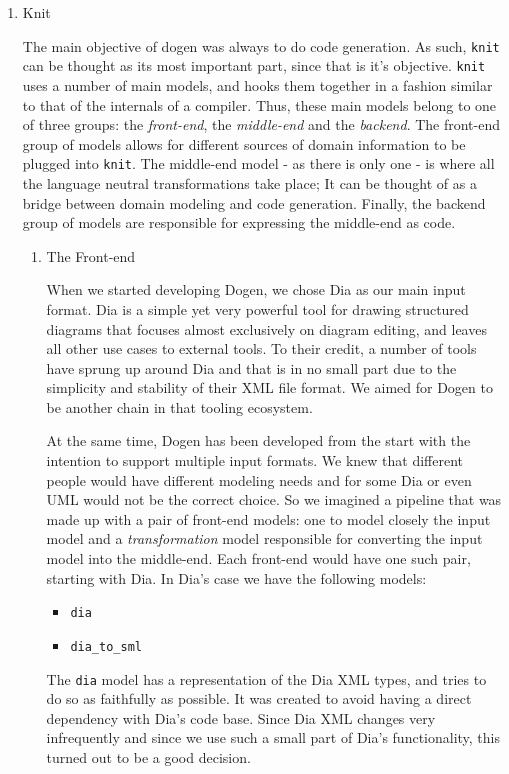 \documentclass[11pt]{article}
\begin{document}
\begin{enumerate}
\item Knit
\label{sec-2-2-1-2}

The main objective of dogen was always to do code generation. As such,
\texttt{knit} can be thought as its most important part, since that is it's
objective. \texttt{knit} uses a number of main models, and hooks them
together in a fashion similar to that of the internals of a
compiler. Thus, these main models belong to one of three groups: the
\emph{front-end}, the \emph{middle-end} and the \emph{backend}. The front-end group
of models allows for different sources of domain information to be
plugged into \texttt{knit}. The middle-end model - as there is only one - is
where all the language neutral transformations take place; It can be
thought of as a bridge between domain modeling and code
generation. Finally, the backend group of models are responsible for
expressing the middle-end as code.

\begin{enumerate}
\item The Front-end
\label{sec-2-2-1-2-1}

When we started developing Dogen, we chose Dia as our main input
format. Dia is a simple yet very powerful tool for drawing structured
diagrams that focuses almost exclusively on diagram editing, and
leaves all other use cases to external tools. To their credit, a
number of tools have sprung up around Dia and that is in no small part
due to the simplicity and stability of their XML file format. We aimed
for Dogen to be another chain in that tooling ecosystem.

At the same time, Dogen has been developed from the start with the
intention to support multiple input formats. We knew that different
people would have different modeling needs and for some Dia or even
UML would not be the correct choice. So we imagined a pipeline that
was made up with a pair of front-end models: one to model closely the
input model and a \emph{transformation} model responsible for converting
the input model into the middle-end. Each front-end would have one
such pair, starting with Dia. In Dia's case we have the following
models:

\begin{itemize}
\item \texttt{dia}
\item \texttt{dia\_to\_sml}
\end{itemize}

The \texttt{dia} model has a representation of the Dia XML types, and tries
to do so as faithfully as possible. It was created to avoid having a
direct dependency with Dia's code base. Since Dia XML changes very
infrequently and since we use such a small part of Dia's
functionality, this turned out to be a good decision.


\end{enumerate}
\end{enumerate}
\end{document}
